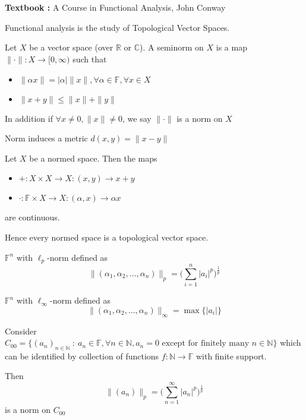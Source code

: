 
\chapter{}

\textbf{Textbook :} A Course in Functional Analysis, John Conway

Functional analysis is the study of Topological Vector Spaces.

\begin{definition}
  Let $X$ be a vector space (over $\mathbb{R}$ or $\mathbb{C}$). A
  seminorm on $X$ is a map $\|\cdot \|: X \to [0, \infty)$ such that
  \begin{itemize}
    \item  $\|\alpha x\| = |\alpha|\| x \|, \forall \alpha \in
      \mathbb{F}, \forall x \in X$
    \item $\|x+y\| \le \|x\| + \|y\|$
  \end{itemize}
  In addition if $\forall x\neq 0, \|x\| \neq 0$, we say $\|\cdot\|$
  is a norm on $X$
\end{definition}

Norm induces a metric $ d(x, y) = \|x-y\|$

\begin{note}
  Let $X$ be a normed space. Then the maps
  \begin{itemize}
    \item $+: X \times X \to X : (x, y) \to x+y$
    \item $\cdot: \mathbb{F} \times X \to X: (\alpha, x) \to \alpha x$
  \end{itemize}
  are continuous.
\end{note}

Hence every normed space is a topological vector space.

\begin{example}
  $\mathbb{F}^n$ with $\ell_p$-norm defined as \[
    \|(\alpha_1, \alpha_2, \ldots, \alpha_n)\|_p = \Big(\sum_{i =
    1}^{n} |a_i|^p\Big)^{ \frac{1}{p} }
  \]
\end{example}

\begin{example}
  $\mathbb{F}^n$ with $\ell_\infty$-norm defined as \[
    \|(\alpha_1, \alpha_2, \ldots, \alpha_n)\|_\infty = \max \{ |a_i| \}
  \]
\end{example}

\begin{example}
  Consider $C_{00} = \{ (a_n)_{n \in \mathbb{N}}  \ : \   a_n \in
    \mathbb{F}, \forall n \in \mathbb{N}, a_n = 0  \textrm{ except for
  finitely many }  n \in \mathbb{N}\}$ which can be identified by
  collection of functions $  f: \mathbb{N} \to \mathbb{F}$ with finite support.

  Then $$\|(a_n)\|_p = \Big(\sum_{n = 1}^{\infty} |a_n|^p\Big)^{ \frac{1}{p} }$$
  is a norm on $C_{00}$
\end{example}

